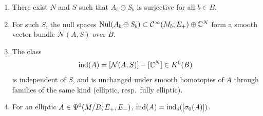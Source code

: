 \begin{lemma}[Stabilization]\label{families:lem:stabilization}
  \begin{enumerate}[label=(\roman*)]
  \item There exist $N$ and $S$ such that $A_b\oplus S_b$ is surjective for all
    $b\in B$.
  \item For such $S$, the null spaces $\operatorname{Nul}(A_b\oplus S_b)\subset
    \mathcal{C}^\infty(M_b;E_+)\oplus\mathbb{C}^N$ form a smooth vector bundle $\mathcal N(A,S)$ over
    $B$.
  \item The class
    \begin{equation*}
      \operatorname{ind}(A)=[\mathcal N(A,S)]-[\mathbb{C}^N]\in K^0(B)
    \end{equation*}
    is independent of $S$, and is unchanged under smooth homotopies of $A$
    through families of the same kind (elliptic, resp.\ fully elliptic).
  \item For an elliptic $A\in\Psi^{0}(M/B;E_+,E_-)$,
    $\operatorname{ind}(A)=\operatorname{ind}_{\mathrm{a}}([\sigma_0(A)])$.
  \end{enumerate}
\end{lemma}
